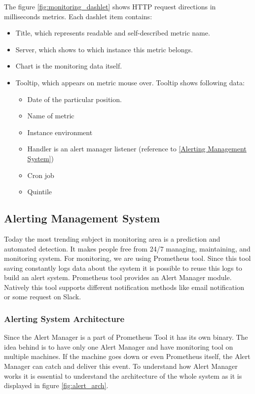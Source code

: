  
The figure \ref{fig:monitoring_dashlet}  shows HTTP request directions in milliseconds metrics. Each dashlet item contains:
\begin{itemize}
\item Title, which represents readable and self-described metric name.
\item Server, which shows to which instance this metric belongs.
\item Chart is the monitoring data itself. 
\item Tooltip, which appears on metric mouse over. Tooltip shows following data:
\begin{itemize}
\item Date of the particular position.
\item Name of metric
\item Instance environment 
\item Handler is an alert manager listener (reference to \autoref{Alerting Management System})
\item Cron job
\item Quintile 
\end{itemize}

\end{itemize}


\subsection{Alerting Management System}\label{Alerting Management System}

Today the most trending subject in monitoring area is a prediction and automated detection. It makes people free from 24/7 managing, maintaining, and monitoring system.
For monitoring, we are using Prometheus tool. Since this tool saving constantly logs data about the system it is possible to reuse this logs to build an alert system. 
Prometheus tool provides an Alert Manager module. Natively this tool supports different notification methods like email notification or some request on Slack. 

\subsubsection{Alerting System Architecture}\label{Alerting System Architecture}

Since the Alert Manager is a part of Prometheus Tool it has its own binary. The idea behind is to have only one Alert Manager and have monitoring tool on multiple machines. If the machine goes down or even Prometheus itself, the Alert Manager can catch and deliver this event. 
To understand how Alert Manager works it is essential to understand the architecture of the whole system as it is displayed in figure \ref{fig:alert_arch}.

